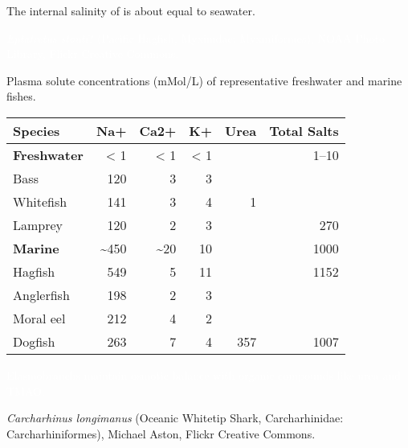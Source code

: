 \documentclass[t]{beamer}
\begin{document}
{
\begin{frame}[b,plain]{The internal salinity of  is about equal to seawater.}

\hfill\tiny\textcolor{white}{\textit{Eptatretus stouti}? (Pacific Hagfish, Myxinidae: Myxiniformes), NOAA Photo Library, Flickr Creative Commons.}
\end{frame}
}

\begin{frame}[c]{Plasma solute concentrations (mMol/L) of representative freshwater and marine fishes.}

\centering\begin{tabular}{lrrrrr}
\toprule
Species	&	Na+	&	Ca2+	&	K+	&	Urea	&	Total Salts \\
\midrule
\textbf{Freshwater}	&	< 1	&	< 1	&	< 1	&		&	1--10 \\
\hspace{1ex}Bass	&	120	&	3	&	3	&		&	 \\
\hspace{1ex}Whitefish	&	141	&	3	&	4	&	1	&	 \\
\hspace{1ex}Lamprey	&	120	&	2	&	3	&		&	270 \\
\textbf{Marine}	&	\textasciitilde450	&	\textasciitilde20	&	10	&		&	1000 \\
\hspace{1ex}Hagfish	&	549	&	5	&	11	&		&	1152 \\
\hspace{1ex}Anglerfish	&	198	&	2	&	3	&		&	 \\
\hspace{1ex}Moral eel	&	212	&	4	&	2	&		&	 \\
\hspace{1ex}Dogfish	&	263	&	7	&	4	&	357	&	1007 \\
\bottomrule
\end{tabular}

\end{frame}
	
{
\begin{frame}[b,plain]{\textcolor{white}{Elasmobranchs maintain osmotic balance with organic compounds like urea and TMAO.}}

\hfill\tiny\textcolor{white!80!black}{\textit{Carcharhinus longimanus} (Oceanic Whitetip Shark, Carcharhinidae: Carcharhiniformes), Michael Aston, Flickr Creative Commons.}
\end{frame}
}
\end{document}
